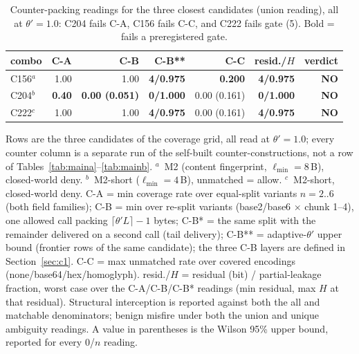 \begin{table}[!htbp]
\centering
\caption{Counter-packing readings for the three closest candidates (union reading), all at $\theta'=1.0$: C204 fails C-A, C156 fails C-C, and C222 fails gate (5). Bold = fails a preregistered gate.}
\label{tab:counters}
\footnotesize
\begin{tabular}{lrrrrrr}
\toprule
combo & C-A & C-B & C-B** & C-C & resid./$H$ & verdict \\
\midrule
C156$^{a}$ & 1.00 & 1.00 & \textbf{4/0.975} & \textbf{0.200} & \textbf{4/0.975} & \textbf{NO} \\
C204$^{b}$ & \textbf{0.40} & \textbf{0.00 (0.051)} & \textbf{0/1.000} & 0.00 (0.161) & \textbf{0/1.000} & \textbf{NO} \\
C222$^{c}$ & 1.00 & 1.00 & \textbf{4/0.975} & 0.00 (0.161) & \textbf{4/0.975} & \textbf{NO} \\
\bottomrule
\end{tabular}
\par\smallskip
{\footnotesize\begin{minipage}{0.98\linewidth}
\footnotesize Rows are the three candidates of the coverage grid, all read at $\theta'=1.0$; every counter column is a separate run of the self-built counter-constructions, not a row of Tables~\ref{tab:maina}--\ref{tab:mainb}. $^{a}$~M2 (content fingerprint, $\ell_{\min}=8$\,B), closed-world deny. $^{b}$~M2-short ($\ell_{\min}=4$\,B), unmatched = allow. $^{c}$~M2-short, closed-world deny. C-A = min coverage rate over equal-split variants $n{=}2..6$ (both field families); C-B = min over re-split variants (base2/base6 $\times$ chunk 1--4), one allowed call packing $\lceil\theta' L\rceil-1$ bytes; C-B* = the same split with the remainder delivered on a second call (tail delivery); C-B** = adaptive-$\theta'$ upper bound (frontier rows of the same candidate); the three C-B layers are defined in Section~\ref{sec:c1}. C-C = max unmatched rate over covered encodings (none/base64/hex/homoglyph). resid./$H$ = residual (bit) / partial-leakage fraction, worst case over the C-A/C-B/C-B* readings (min residual, max $H$ at that residual). Structural interception is reported against both the all and matchable denominators; benign misfire under both the union and unique ambiguity readings. A value in parentheses is the Wilson 95\% upper bound, reported for every 0/$n$ reading.
\end{minipage}}
\end{table}
